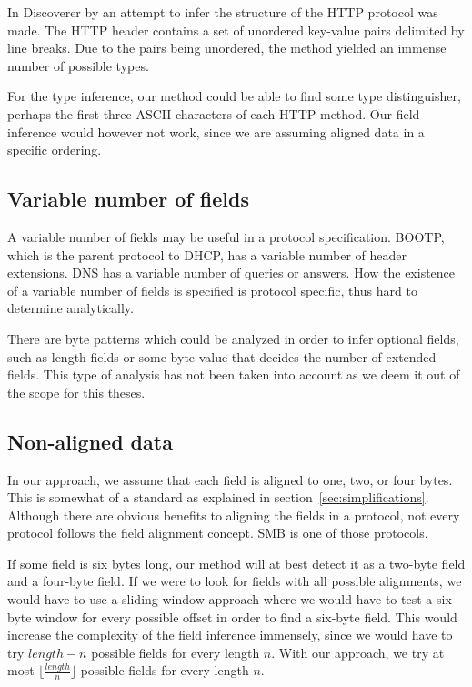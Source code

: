 \documentclass[a4paper]{report}
\begin{document}
In Discoverer by \citeauthor{cui07} an attempt to infer the structure of
the HTTP protocol was made. The HTTP header contains a set of unordered
key-value pairs delimited by line breaks. Due to the pairs being unordered,
the method yielded an immense number of possible types.

For the type inference, our method could be able to find some type
distinguisher, perhaps the first three ASCII characters of each HTTP method.
Our field inference would however not work, since we are assuming aligned
data in a specific ordering.

\subsection{Variable number of fields}
A variable number of fields may be useful in a protocol specification. BOOTP,
which is the parent protocol to DHCP, has a variable number of header 
extensions. DNS has a variable number of queries or answers. How the existence
of a variable number of fields is specified is protocol specific, thus hard to
determine analytically.

There are byte patterns which could be analyzed in order to infer optional
fields, such as length fields or some byte value that decides the number of
extended fields. This type of analysis has not been taken into account as we
deem it out of the scope for this theses.

\subsection{Non-aligned data}
In our approach, we assume that each field is aligned to one, two, or four
bytes. This is somewhat of a standard as explained in
section~\ref{sec:simplifications}. Although there are obvious benefits to
aligning the fields in a protocol, not every protocol follows the field
alignment concept. SMB is one of those protocols.

If some field is six bytes long, our method will at best detect it as a
two-byte field and a four-byte field. If we were to look for fields with
all possible alignments, we would have to use a sliding window approach where
we would have to test a six-byte window for every possible offset in order
to find a six-byte field. This would increase the complexity of the field
inference immensely, since we would have to try $length - n$ possible fields
for every length $n$. With our approach, we try at most
$\lfloor \frac{length}{n} \rfloor$ possible fields for every length $n$.
\end{document}
